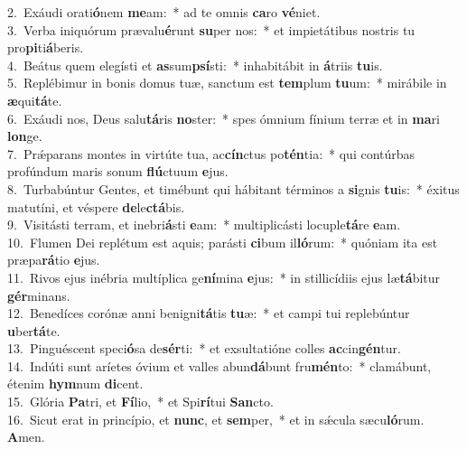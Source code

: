 {2.~}Exáudi orati\textbf{ó}nem \textbf{me}am:~* ad te omnis \textbf{ca}ro \textbf{vé}niet.\\
{3.~}Verba iniquórum prævalu\textbf{é}runt \textbf{su}per nos:~* et impietátibus nostris tu pro\textbf{pi}ti\textbf{á}beris.\\
{4.~}Beátus quem elegísti et \textbf{as}sum\textbf{psí}sti:~* inhabitábit in \textbf{á}triis \textbf{tu}is.\\
{5.~}Replébimur in bonis domus tuæ, sanctum est \textbf{tem}plum \textbf{tu}um:~* mirábile in \textbf{æ}qui\textbf{tá}te.\\
{6.~}Exáudi nos, Deus salu\textbf{tá}ris \textbf{no}ster:~* spes ómnium fínium terræ et in \textbf{ma}ri \textbf{lon}ge.\\
{7.~}Prǽparans montes in virtúte tua, ac\textbf{cín}ctus po\textbf{tén}tia:~* qui contúrbas profúndum maris sonum \textbf{flú}ctuum \textbf{e}jus.\\
{8.~}Turbabúntur Gentes, et timébunt qui hábitant términos a \textbf{si}gnis \textbf{tu}is:~* éxitus matutíni, et véspere \textbf{de}le\textbf{ctá}bis.\\
{9.~}Visitásti terram, et inebri\textbf{á}sti \textbf{e}am:~* multiplicásti locuple\textbf{tá}re \textbf{e}am.\\
{10.~}Flumen Dei replétum est aquis; parásti \textbf{ci}bum il\textbf{ló}rum:~* quóniam ita est præpa\textbf{rá}tio \textbf{e}jus.\\
{11.~}Rivos ejus inébria multíplica ge\textbf{ní}mina \textbf{e}jus:~* in stillicídiis ejus læ\textbf{tá}bitur \textbf{gér}minans.\\
{12.~}Benedíces corónæ anni benigni\textbf{tá}tis \textbf{tu}æ:~* et campi tui replebúntur \textbf{u}ber\textbf{tá}te.\\
{13.~}Pinguéscent speci\textbf{ó}sa de\textbf{sér}ti:~* et exsultatióne colles \textbf{ac}cin\textbf{gén}tur.\\
{14.~}Indúti sunt aríetes óvium et valles abun\textbf{dá}bunt fru\textbf{mén}to:~* clamábunt, étenim \textbf{hym}num \textbf{di}cent.\\
{15.~}Glória \textbf{Pa}tri, et \textbf{Fí}lio,~* et Spi\textbf{rí}tui \textbf{San}cto.\\
{16.~}Sicut erat in princípio, et \textbf{nunc}, et \textbf{sem}per,~* et in sǽcula sæcu\textbf{ló}rum. \textbf{A}men.\\
